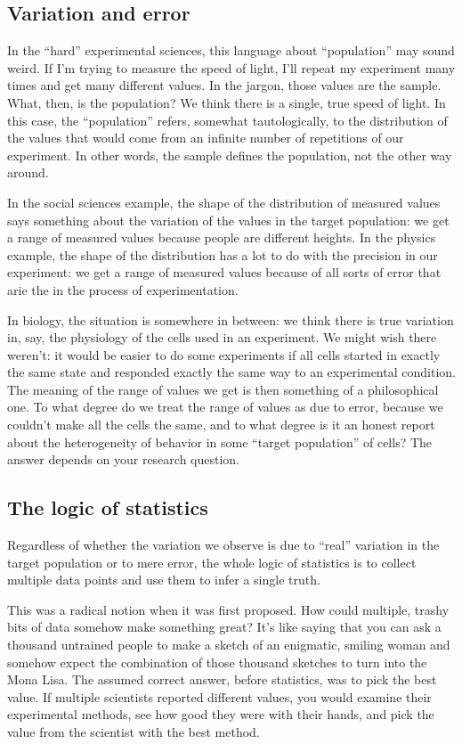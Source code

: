 \subsection{Variation and error}

In the ``hard'' experimental sciences, this language about ``population'' may
sound weird. If I'm trying to measure the speed of light, I'll repeat my
experiment many times and get many different values. In the jargon, those
values are the sample. What, then, is the population? We think there is a
single, true speed of light. In this case, the ``population'' refers, somewhat
tautologically, to the distribution of the values that would come from an
infinite number of repetitions of our experiment. In other words, the sample
defines the population, not the other way around.

In the social sciences example, the shape of the distribution of measured
values says something about the variation of the values in the target
population: we get a range of measured values because people are different
heights. In the physics example, the shape of the distribution has a lot to do
with the precision in our experiment: we get a range of measured values
because of all sorts of error that arie the in the process of experimentation.

In biology, the situation is somewhere in between: we think there is true
variation in, say, the physiology of the cells used in an experiment. We
might wish there weren't: it would be easier to do some experiments if all
cells started in exactly the same state and responded exactly the same way to
an experimental condition. The meaning of the range of values we get is then
something of a philosophical one. To what degree do we treat the range of
values as due to error, because we couldn't make all the cells the same, and
to what degree is it an honest report about the heterogeneity of behavior in
some ``target population'' of cells? The answer depends on your research
question.

\subsection{The logic of statistics}

Regardless of whether the variation we observe is due to ``real'' variation in
the target population or to mere error, the whole logic of statistics is to
collect multiple data points and use them to infer a single truth.

This was a radical notion when it was first proposed. How could multiple,
trashy bits of data somehow make something great? It's like saying that you
can ask a thousand untrained people to make a sketch of an enigmatic, smiling
woman and somehow expect the combination of those thousand sketches to turn
into the Mona Lisa. The assumed correct answer, before statistics, was to pick
the best value. If multiple scientists reported different values, you would
examine their experimental methods, see how good they were with their hands,
and pick the value from the scientist with the best method.

